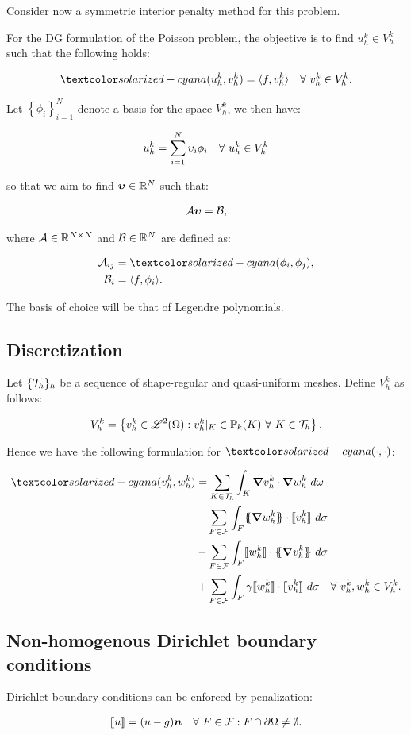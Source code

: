 Consider now a symmetric interior penalty method for this problem.

For the DG formulation of the Poisson problem, the objective is to find $u^k_h \in V^k_h$ such that the following holds:

\begin{gather}
    \boa{u^k_h}{v^k_h} = \langle f, v^k_h \rangle \quad \Forall v^k_h \in V^k_h.
\end{gather}

Let $\left\{ \phi_i \right\}_{i = 1}^N$ denote a basis for the space $V^k_h$, we then have:

\begin{gather}
    u^k_h = \sum_{i = 1}^N \upsilon_i \phi_i \quad \forall ~ u^k_h \in V^k_h
\end{gather}

so that we aim to find $\bm{\upsilon} \in \mathbb{R}^N$ such that:

\begin{gather}
    \mathcal{A} \bm{\upsilon} = \mathcal{B},
\end{gather}

where $\mathcal{A} \in \mathbb{R}^{N \times N}$ and $\mathcal{B} \in \mathbb{R}^N$ are defined as:

\begin{align}
    \MA_{ij} &= \boa{\phi_i}{\phi_j}, \\ 
    \VB_i &= \langle f, \phi_i \rangle.
\end{align}

The basis of choice will be that of Legendre polynomials.

\subsection{Discretization}

Let $\{\mathcal{T}_h\}_h$ be a sequence of shape-regular and quasi-uniform meshes. Define $V^k_h$ as follows:

\begin{gather}
    V^k_h = \left\{ v^k_h \in \mathscr{L}^2(\Omega): v^k_h \vert_K \in \mathbb{P}_{k}(K) ~ \forall ~ K \in \mathcal{T}_h \right\}.
\end{gather}

Hence we have the following formulation for $\boa{\cdot}{\cdot}$:

\begin{align}
    \boa{v^k_h}{w^k_h} &= \sum_{K \in \Tau_h} \int_K \grad v^k_h \cdot \grad w^k_h ~ d \omega \\
    &- \sum_{F \in \F} \int_F \{\!\!\{ \grad w^k_h \}\!\!\} \cdot \llbracket v^k_h \rrbracket ~ d \sigma \\
    &- \sum_{F \in \F} \int_F \llbracket w^k_h \rrbracket \cdot \{\!\!\{ \grad v^k_h \}\!\!\} ~ d \sigma \\
    &+ \sum_{F \in \F} \int_F \gamma \llbracket w^k_h \rrbracket \cdot \llbracket v^k_h \rrbracket ~ d \sigma \quad \Forall v^k_h, w^k_h \in V^k_h.
\end{align}

\subsection{Non-homogenous Dirichlet boundary conditions}

Dirichlet boundary conditions can be enforced by penalization:

\begin{gather}
    \llbracket u \rrbracket = (u - g) \bm{n} \quad \forall ~ F \in \mathcal{F} : F \cap \partial \Omega \neq \emptyset.
\end{gather}